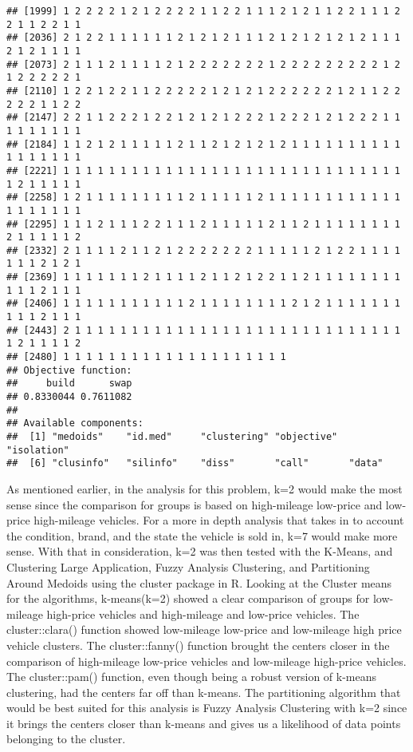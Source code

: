 \documentclass[
]{article}
\begin{document}
\begin{verbatim}
## [1999] 1 2 2 2 2 1 2 1 2 2 2 2 1 1 2 2 1 1 1 2 1 2 1 1 2 2 1 1 1 2 2 1 1 2 2 1 1
## [2036] 2 1 2 2 1 1 1 1 1 1 2 1 2 1 2 1 1 1 2 1 2 1 2 1 2 1 2 1 1 1 2 1 2 1 1 1 1
## [2073] 2 1 1 1 2 1 1 1 1 2 1 2 2 2 2 2 2 2 1 2 2 2 2 2 2 2 2 2 1 2 1 2 2 2 2 2 1
## [2110] 1 2 2 1 2 2 1 1 2 2 2 2 2 1 2 1 2 1 2 2 2 2 2 2 1 2 1 1 2 2 2 2 2 1 1 2 2
## [2147] 2 2 1 1 2 2 2 1 2 2 1 2 1 2 1 2 2 2 1 2 2 2 1 2 1 2 2 2 1 1 1 1 1 1 1 1 1
## [2184] 1 1 2 1 2 1 1 1 1 1 2 1 1 2 1 2 1 2 1 2 1 1 1 1 1 1 1 1 1 1 1 1 1 1 1 1 1
## [2221] 1 1 1 1 1 1 1 1 1 1 1 1 1 1 1 1 1 1 1 1 1 1 1 1 1 1 1 1 1 1 1 2 1 1 1 1 1
## [2258] 1 2 1 1 1 1 1 1 1 1 1 2 1 1 1 1 1 2 1 1 1 1 1 1 1 1 1 1 1 1 1 1 1 1 1 1 1
## [2295] 1 1 1 2 1 1 1 2 2 1 1 1 2 1 1 1 1 1 2 1 1 2 1 1 1 1 1 1 1 1 2 1 1 1 1 1 2
## [2332] 2 1 1 1 1 2 1 1 2 1 2 2 2 2 2 2 2 1 1 1 1 1 2 1 2 2 1 1 1 1 1 1 1 2 1 2 1
## [2369] 1 1 1 1 1 1 1 2 1 1 1 1 2 1 1 2 1 2 2 1 1 2 1 1 1 1 1 1 1 1 1 1 1 2 1 1 1
## [2406] 1 1 1 1 1 1 1 1 1 1 1 2 1 1 1 1 1 1 1 1 2 1 2 1 1 1 1 1 1 1 1 1 1 2 1 1 1
## [2443] 2 1 1 1 1 1 1 1 1 1 1 1 1 1 1 1 1 1 1 1 1 1 1 1 1 1 1 1 1 1 1 2 1 1 1 1 2
## [2480] 1 1 1 1 1 1 1 1 1 1 1 1 1 1 1 1 1 1 1 1
## Objective function:
##     build      swap 
## 0.8330044 0.7611082 
## 
## Available components:
##  [1] "medoids"    "id.med"     "clustering" "objective"  "isolation" 
##  [6] "clusinfo"   "silinfo"    "diss"       "call"       "data"
\end{verbatim}

As mentioned earlier, in the analysis for this problem, k=2 would make
the most sense since the comparison for groups is based on high-mileage
low-price and low-price high-mileage vehicles. For a more in depth
analysis that takes in to account the condition, brand, and the state
the vehicle is sold in, k=7 would make more sense. With that in
consideration, k=2 was then tested with the K-Means, and Clustering
Large Application, Fuzzy Analysis Clustering, and Partitioning Around
Medoids using the cluster package in R. Looking at the Cluster means for
the algorithms, k-means(k=2) showed a clear comparison of groups for
low-mileage high-price vehicles and high-mileage and low-price vehicles.
The cluster::clara() function showed low-mileage low-price and
low-mileage high price vehicle clusters. The cluster::fanny() function
brought the centers closer in the comparison of high-mileage low-price
vehicles and low-mileage high-price vehicles. The cluster::pam()
function, even though being a robust version of k-means clustering, had
the centers far off than k-means. The partitioning algorithm that would
be best suited for this analysis is Fuzzy Analysis Clustering with k=2
since it brings the centers closer than k-means and gives us a
likelihood of data points belonging to the cluster.
\end{document}
